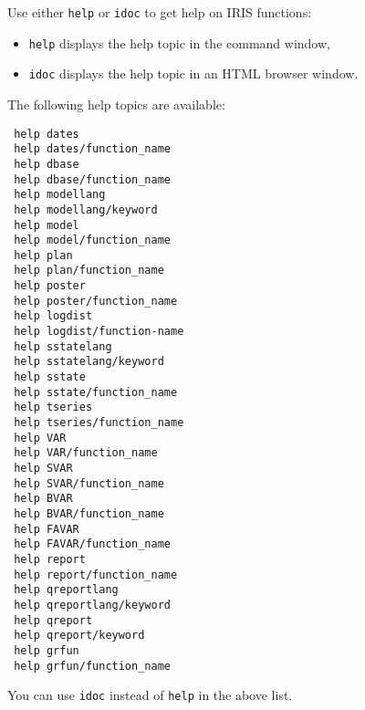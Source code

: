 

	Use either \texttt{help} or \texttt{idoc} to get help on IRIS functions:
 
 \begin{itemize}
 \item
   \texttt{help} displays the help topic in the command window,
 \item
   \texttt{idoc} displays the help topic in an HTML browser window.
 \end{itemize}
 
 The following help topics are available:
 
 \begin{verbatim}
 help dates
 help dates/function_name
 help dbase
 help dbase/function_name
 help modellang
 help modellang/keyword
 help model
 help model/function_name
 help plan
 help plan/function_name
 help poster
 help poster/function_name
 help logdist
 help logdist/function-name
 help sstatelang
 help sstatelang/keyword
 help sstate
 help sstate/function_name
 help tseries
 help tseries/function_name
 help VAR
 help VAR/function_name
 help SVAR
 help SVAR/function_name
 help BVAR
 help BVAR/function_name
 help FAVAR
 help FAVAR/function_name
 help report
 help report/function_name
 help qreportlang
 help qreportlang/keyword
 help qreport
 help qreport/keyword
 help grfun
 help grfun/function_name
 \end{verbatim}
 
 You can use \texttt{idoc} instead of \texttt{help} in the above list.



